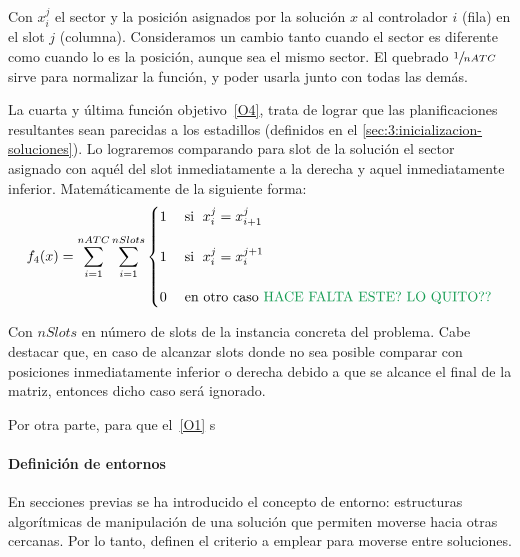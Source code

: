 
Con $x_i^j$ el sector y la posición asignados por la solución $x$ al controlador $i$ (fila) en el slot $j$ (columna). Consideramos un cambio tanto cuando el sector es diferente como cuando lo es la posición, aunque sea el mismo sector.
El quebrado $\sfrac{1}{nATC}$ sirve para normalizar la función, y poder usarla junto con todas las demás.

La cuarta y última función objetivo~\ref{O4}, trata de lograr que las planificaciones resultantes sean parecidas a los estadillos (definidos en el \autoref{sec:3:inicializacion-soluciones}). Lo lograremos comparando para slot de la solución el sector asignado con aquél del slot inmediatamente a la derecha y aquel inmediatamente inferior. Matemáticamente de la siguiente forma:
%
\[
    f_4(x) = \sum_{i=1}^{nATC} \sum_{i=1}^{nSlots}
    \begin{cases}
        1 & \; \textrm{si } \; x_i^j = x_{i+1}^{j} \\
        \\
        1 & \; \textrm{si } \; x_i^j = x_{i}^{j+1}   \\
        \\
        0 & \; \textrm{en otro caso }  \NOTE{\textrm{HACE FALTA ESTE? LO QUITO??}}
    \end{cases}
\]

Con $nSlots$ en número de slots de la instancia concreta del problema. Cabe destacar que, en caso de alcanzar slots
donde no sea posible comparar con posiciones inmediatamente inferior o derecha debido a que se alcance el final de la matriz, entonces dicho caso será ignorado.

Por otra parte, para que el~\ref{O1} s

\paragraph{Definición de entornos} \label{paragraph:entornos}
En secciones previas se ha introducido el concepto de entorno: estructuras algorítmicas de manipulación de una solución que permiten moverse hacia otras cercanas. Por lo tanto, definen el criterio a emplear para moverse entre soluciones.

